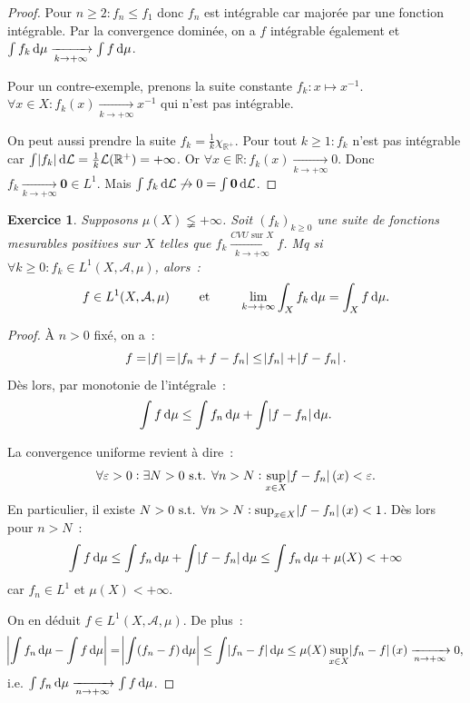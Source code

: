 \documentclass{article}
\newtheorem{ex}{Exercice}[section]
\newcommand{\pinfty}{{+\infty}}
\newcommand{\st}{\text{ s.t. }}
\newcommand{\R}{{\mathbb R}}
\begin{document}
\begin{proof} Pour $n \geq 2 : f_n \leq f_1$ donc $f_n$ est intégrable car majorée par une fonction intégrable. Par la convergence dominée, on a $f$ intégrable
également et $\int f_k\dif\mu \xrightarrow[k \to \pinfty]{} \int f\dif\mu$.

Pour un contre-exemple, prenons la suite constante $f_k : x \mapsto x^{-1}$. $\forall x \in X : f_k(x) \xrightarrow[k \to \pinfty]{} x^{-1}$ qui n'est pas intégrable.

On peut aussi prendre la suite $f_k = \frac 1k\chi_{\R^+}$. Pour tout $k \geq 1 : f_k$ n'est pas intégrable car $\int\abs {f_k}\dif\mathcal L = \frac 1k\mathcal L(\R^+) = \pinfty$.
Or $\forall x \in \R : f_k(x) \xrightarrow[k \to \pinfty]{} 0$. Donc $f_k \xrightarrow[k \to \pinfty]{} \mathbf 0 \in L^1$.
Mais $\int f_k\dif\mathcal L \not \to 0 = \int\mathbf 0\dif\mathcal L$.
\end{proof}

\begin{ex} Supposons $\mu(X) \lneqq \pinfty$. Soit $(f_k)_{k \geq 0}$ une suite de fonctions mesurables positives sur $X$ telles que
$f_k \xrightarrow[k \to \pinfty]{CVU \text{ sur }X} f$. Mq si $\forall k \geq 0 : f_k \in L^1(X, \mathcal A, \mu)$, alors~:
\[f \in L^1(X, \mathcal A, \mu) \qquad \text{ et } \qquad \lim_{k \to \pinfty}\int_Xf_k\dif\mu = \int_Xf\dif\mu.\]
\end{ex}

\begin{proof} À $n > 0$ fixé, on a~:
\[f = \abs f = \abs {f_n + f - f_n} \leq \abs {f_n} + \abs {f - f_n}.\]
Dès lors, par monotonie de l'intégrale~:
\[\int f\dif \mu \leq \int f_n\dif \mu + \int \abs {f-f_n}\dif\mu.\]

La convergence uniforme revient à dire~:
\[\forall \varepsilon > 0 : \exists N > 0 \st \forall n > N : \sup_{x \in X}\abs {f - f_n}(x) < \varepsilon.\]
En particulier, il existe $N > 0 \st \forall n > N : \sup_{x \in X}\abs {f - f_n}(x) < 1$. Dès lors pour $n > N$~:
\[\int f\dif\mu \leq \int f_n\dif \mu + \int \abs {f - f_n}\dif \mu \leq \int f_n \dif\mu + \mu(X) < \pinfty\]
car $f_n \in L^1$ et $\mu(X) < \pinfty$.

On en déduit $f \in L^1(X, \mathcal A, \mu)$. De plus~:
\[\abs {\int f_n\dif\mu - \int f\dif\mu} = \abs {\int (f_n-f)\dif\mu} \leq \int \abs {f_n - f}\dif\mu \leq \mu(X)\sup_{x \in X}\abs {f_n-f}(x) \xrightarrow[n \to \pinfty]{} 0,\]
i.e. $\int f_n\dif\mu \xrightarrow[n \to \pinfty]{} \int f\dif\mu$.
\end{proof}
\end{document}
